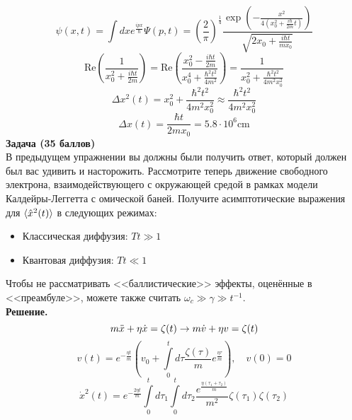 \documentclass[12pt]{article}
\theoremstyle{definition}
\begin{document}
\begin{equation}
    \psi(x,t)=\int dxe^{\frac{ipx}{\hbar}}\Psi(p,t)=\left(\frac{2}{\pi}\right)^\frac{1}{4}\frac{\exp\left(-\frac{x^2}{4(x^2_0+\frac{i\hbar}{2m} t)}\right)}{\sqrt{2x_0+\frac{i\hbar t}{mx_0}}}
\end{equation}
\begin{equation}
    \text{Re}\left(\frac{1}{x^2_0+\frac{i\hbar t}{2m}}\right)=\text{Re}\left(\frac{x^2_0-\frac{i\hbar t}{2m}}{x^4_0+\frac{\hbar^2t^2}{4m^2}}\right)=\frac{1}{x^2_0+\frac{\hbar^2t^2}{4m^2x_0^2}}
\end{equation}
\begin{equation}
    \Delta x^2(t)=x^2_0+\frac{\hbar^2t^2}{4m^2x_0^2}\approx\frac{\hbar^2t^2}{4m^2x_0^2}
\end{equation}
\begin{equation}
    \boxed{\Delta x(t)=\frac{\hbar t}{2mx_0}=5.8\cdot10^6\text{cm}}
\end{equation}
\textbf{Задача (35 баллов)}\\
В предыдущем упражнении вы должны были получить ответ, который должен был вас удивить и насторожить. Рассмотрите теперь движение свободного электрона, взаимодействующего с окружающей средой в рамках модели Калдейры-Леггетта с омической баней. Получите асимптотические выражения для $\braket{\hat{x}^2(t)}$ в следующих режимах:
\begin{itemize}
    \item Классическая диффузия: $Tt\gg1$
    \item Квантовая диффузия: $Tt\ll1$
\end{itemize}
Чтобы не рассматривать <<баллистические>> эффекты, оценённые в <<преамбуле>>, можете также считать $\omega_c\gg\gamma\gg t^{-1}$.\\
\textbf{Решение.}\\
\begin{equation}
    m\Ddot{x}+\eta\dot{x}=\zeta(t)\rightarrow m\dot{v}+\eta v=\zeta(t)
\end{equation}
\begin{equation}
    v(t)=e^{-\frac{\eta t}{m}}\left(v_0+\int\limits_0^t d\tau\frac{\zeta(\tau)}{m}e^{\frac{\eta\tau}{m}}\right),\quad v(0)=0
\end{equation}
\begin{equation}
    \dot{x}^2(t)=e^{-\frac{2\eta t}{m}}\int\limits_0^td\tau_1\int\limits_0^td\tau_2\frac{e^{\frac{\eta(\tau_1+\tau_2)}{m}}}{m^2}\zeta(\tau_1)\zeta(\tau_2)
\end{equation}
\end{document}

